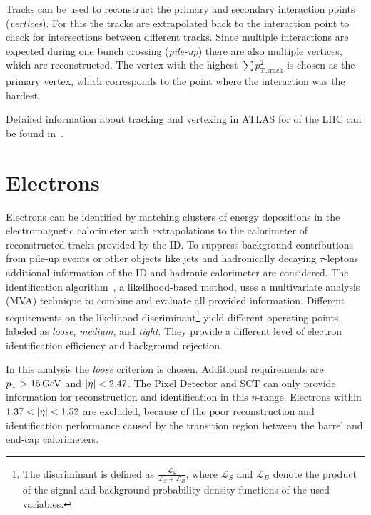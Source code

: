 Tracks can be used to reconstruct the primary and secondary interaction points (\emph{vertices}).
For this the tracks are extrapolated back to the interaction point to check for intersections between different tracks.
Since multiple interactions are expected during one bunch crossing (\emph{pile-up}) there are also multiple vertices, which
are reconstructed.
The vertex with the highest $\sum p_{\text{T},\text{track}}^2$ is chosen as the primary vertex, which corresponds to the
point where the interaction was the hardest.

Detailed information about tracking and vertexing in ATLAS for \runtwo{} of the LHC
can be found in~\cite{ATL-PHYS-PUB-2015-051,ATL-PHYS-PUB-2015-006,ATL-PHYS-PUB-2015-026}.


\section{Electrons}\label{sec:object_selection:electrons}

Electrons can be identified by matching clusters of energy depositions in the electromagnetic calorimeter with
extrapolations to the calorimeter of reconstructed tracks provided by the ID\@.
To suppress background contributions from pile-up events or other objects like jets and hadronically decaying $\tau$-leptons
additional information of the ID and hadronic calorimeter are considered.
The identification algorithm~\cite{ATLAS-CONF-2016-024}, a likelihood-based method, uses a multivariate analysis (MVA) technique to
combine and evaluate all provided information.
Different requirements on the likelihood discriminant\footnote{The discriminant is defined as
$\frac{\mathcal{L}_S}{\mathcal{L}_S + \mathcal{L}_B}$, where $\mathcal{L}_S$ and $\mathcal{L}_B$ denote the product of
the signal and background probability density functions of the used variables.} yield different operating points,
labeled as  \emph{loose}, \emph{medium}, and \emph{tight}.
They provide a different level of electron identification efficiency and background rejection.

In this analysis the \emph{loose} criterion is chosen.
Additional requirements are $\pt > \unit[15]{GeV}$ and $\left|\eta\right| < 2.47$.
The Pixel Detector and SCT can only provide information for reconstruction and identification in this $\eta$-range.
Electrons within $1.37 < \left|\eta\right| < 1.52$ are excluded, because of the poor reconstruction and identification
performance caused by the transition region between the barrel and end-cap calorimeters.

